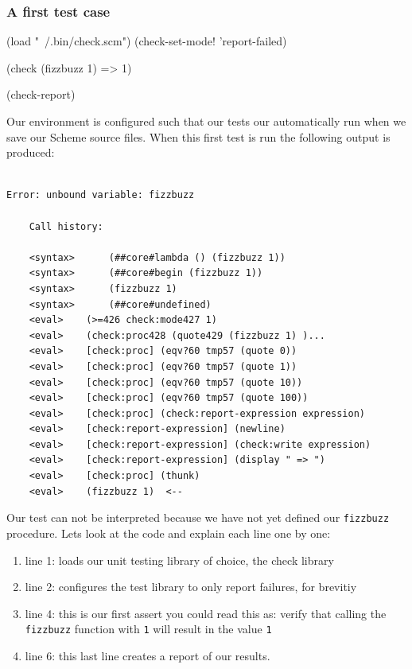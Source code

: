 \documentclass[12pt,a4paper,english,twoside]{article}
\begin{document}
\subsubsection{A first test case}
\begin{schemecode}
(load "~/.bin/check.scm")
(check-set-mode! 'report-failed)

(check (fizzbuzz 1) => 1)

(check-report)
\end{schemecode}
Our environment is configured such that our tests our automatically run when 
we save our Scheme source files. When this first test is run the following 
output is produced:
\begin{lstlisting}

Error: unbound variable: fizzbuzz

    Call history:

    <syntax>	  (##core#lambda () (fizzbuzz 1))
    <syntax>	  (##core#begin (fizzbuzz 1))
    <syntax>	  (fizzbuzz 1)
    <syntax>	  (##core#undefined)
    <eval>	  (>=426 check:mode427 1)
    <eval>	  (check:proc428 (quote429 (fizzbuzz 1) )...
    <eval>	  [check:proc] (eqv?60 tmp57 (quote 0))
    <eval>	  [check:proc] (eqv?60 tmp57 (quote 1))
    <eval>	  [check:proc] (eqv?60 tmp57 (quote 10))
    <eval>	  [check:proc] (eqv?60 tmp57 (quote 100))
    <eval>	  [check:proc] (check:report-expression expression)
    <eval>	  [check:report-expression] (newline)
    <eval>	  [check:report-expression] (check:write expression)
    <eval>	  [check:report-expression] (display " => ")
    <eval>	  [check:proc] (thunk)
    <eval>	  (fizzbuzz 1)	<--
\end{lstlisting}
Our test can not be interpreted because we have not yet defined our 
\texttt{fizzbuzz} procedure. Lets look at the code and explain each line 
one by one:

\begin{enumerate}
  \item line 1: loads our unit testing library of choice, the check library
  \item line 2: configures the test library to only report failures, for 
  brevitiy
  \item line 4: this is our first assert you could read this as: verify that calling 
    the \texttt{fizzbuzz} function with \texttt{1} will result in the value 
    \texttt{1}
 \item line 6: this last line creates a report of our results.
\end{enumerate}
\end{document}
